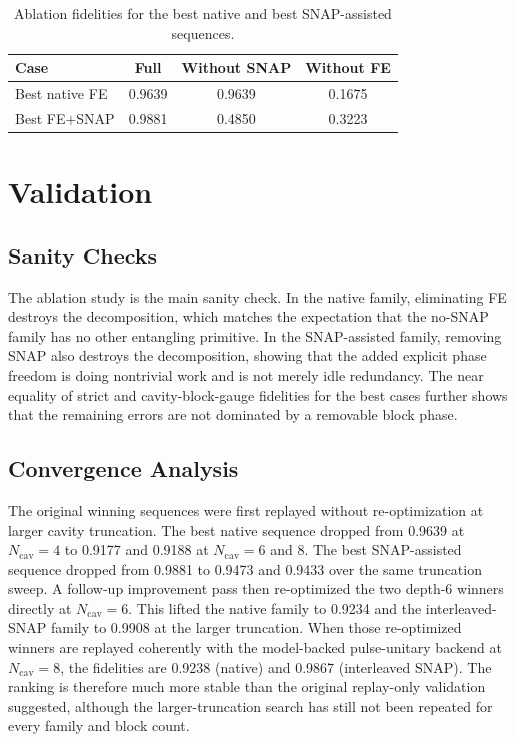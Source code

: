 \documentclass[aps,pra,twocolumn,reprint,amsmath,amssymb]{revtex4-2}
\begin{document}
\begin{table}[H]
  \centering
  \caption{Ablation fidelities for the best native and best SNAP-assisted
  sequences.}
  \label{tab:ablation}
  \begin{tabular}{@{}lccc@{}}
    \toprule
    Case & Full & Without SNAP & Without FE \\
    \midrule
    Best native FE & 0.9639 & 0.9639 & 0.1675 \\
    Best FE+SNAP & 0.9881 & 0.4850 & 0.3223 \\
    \bottomrule
  \end{tabular}
\end{table}

\section{Validation}
\subsection{Sanity Checks}
The ablation study is the main sanity check. In the native family, eliminating
FE destroys the decomposition, which matches the expectation that the no-SNAP
family has no other entangling primitive. In the SNAP-assisted family, removing
SNAP also destroys the decomposition, showing that the added explicit phase
freedom is doing nontrivial work and is not merely idle redundancy. The near
equality of strict and cavity-block-gauge fidelities for the best cases further
shows that the remaining errors are not dominated by a removable block phase.

\subsection{Convergence Analysis}
The original winning sequences were first replayed without re-optimization at
larger cavity truncation. The best native sequence dropped from 0.9639 at
$N_{\mathrm{cav}}=4$ to 0.9177 and 0.9188 at $N_{\mathrm{cav}}=6$ and 8. The
best SNAP-assisted sequence dropped from 0.9881 to 0.9473 and 0.9433 over the
same truncation sweep. A follow-up improvement pass then re-optimized the two
depth-6 winners directly at $N_{\mathrm{cav}}=6$. This lifted the native family
to 0.9234 and the interleaved-SNAP family to 0.9908 at the larger truncation.
When those re-optimized winners are replayed coherently with the
model-backed pulse-unitary backend at $N_{\mathrm{cav}}=8$, the fidelities are
0.9238 (native) and 0.9867 (interleaved SNAP). The ranking is therefore much
more stable than the original replay-only validation suggested, although the
larger-truncation search has still not been repeated for every family and block
count.
\end{document}
